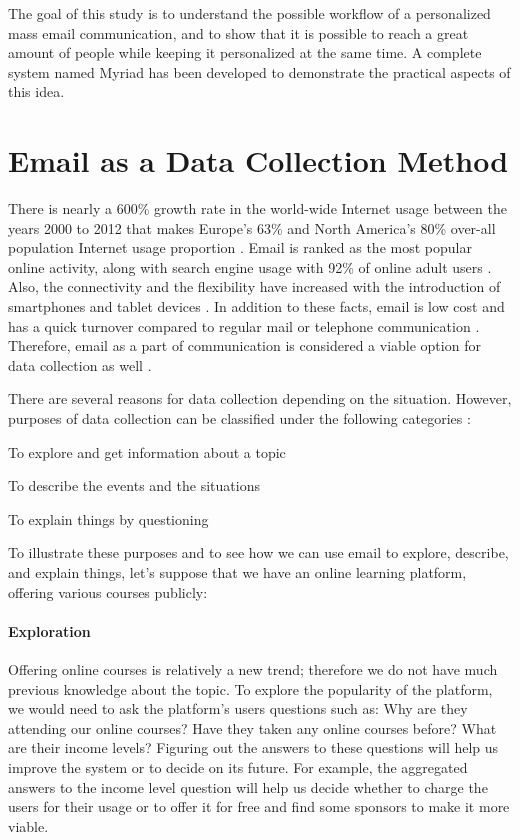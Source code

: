 The goal of this study is to understand the possible workflow of a personalized mass email communication, and to show that it is possible to reach a great amount of people while keeping it personalized at the same time. A complete system named Myriad has been developed to demonstrate the practical aspects of this idea.

\section{Email as a Data Collection Method}
\label{sec:1:EmailDataCol}

There is nearly a 600\% growth rate in the world-wide Internet usage between the years 2000 to 2012 that makes Europe's 63\% and North America's 80\% over-all population Internet usage proportion \citep{InternetWorldStats2012}. Email is ranked as the most popular online activity, along with search engine usage with 92\% of online adult users \citep{Purcell2011}. Also, the connectivity and the flexibility have increased with the introduction of smartphones and tablet devices \citep{Madden2008}. In addition to these facts, email is low cost and has a quick turnover compared to regular mail or telephone communication \citep{Zikmund2007}. Therefore, email as a part of communication is considered a viable option for data collection as well \citep{Zikmund2007}.
\vspace{1cm}

There are several reasons for data collection depending on the situation. However, purposes of data collection can be classified under the following categories \citep{Sue2011} \citep[pages 92--94]{Babbie2010}:

\begin{compactenum}
	\item To explore and get information about a topic
	\item To describe the events and the situations
	\item To explain things by questioning
\end{compactenum}

To illustrate these purposes and to see how we can use email to explore, describe, and explain things, let's suppose that we have an online learning platform, offering various courses publicly:

\paragraph{Exploration}
Offering online courses is relatively a new trend; therefore we do not have much previous knowledge about the topic. To explore the popularity of the platform, we would need to ask the platform's users questions such as: Why are they attending our online courses? Have they taken any online courses before? What are their income levels? Figuring out the answers to these questions will help us improve the system or to decide on its future. For example, the aggregated answers to the income level question will help us decide whether to charge the users for their usage or to offer it for free and find some sponsors to make it more viable.

